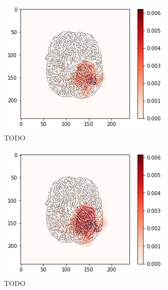 \begin{figure}[H]
    \centering
    \begin{subfigure}{.33\textwidth}
        \centering
        \includegraphics[width=\linewidth]{chapters/06_hdm/b_Brats18_TCIA08_242_1_L2/38.png}
        \caption{TODO}
    \end{subfigure}%
    \begin{subfigure}{.33\textwidth}
        \centering
        \includegraphics[width=\linewidth]{chapters/06_hdm/circle15/18.png}
        \caption{TODO}
    \end{subfigure}
        \begin{subfigure}{.33\textwidth}

\end{subfigure}
\end{figure}
